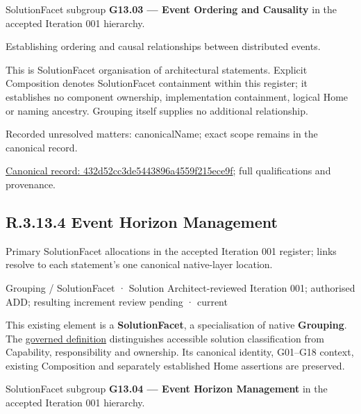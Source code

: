 SolutionFacet subgroup \textbf{G13.03 — Event Ordering and Causality} in the accepted Iteration 001 hierarchy.



Establishing ordering and causal relationships between distributed events.



This is SolutionFacet organisation of architectural statements. Explicit Composition denotes SolutionFacet containment within this register; it establishes no component ownership, implementation containment, logical Home or naming ancestry. Grouping itself supplies no additional relationship.


{\small Recorded unresolved matters: canonicalName; exact scope remains in the canonical record.}\par
{\footnotesize \href{../../../../../../../continuum/grouping/432d52cc3de5443896a4559f215ece9f.md}{Canonical record: 432d52cc3de5443896a4559f215ece9f}; full qualifications and provenance.}\par
\subsection*{R.3.13.4 Event Horizon Management}
\label{navigation:R.3.13.4}

Primary SolutionFacet allocations in the accepted Iteration 001 register; links resolve to each statement’s one canonical native-layer location.\par
\label{element:22fce0d656ef4df89d2a35a85fa92aa1}
{\small Grouping / SolutionFacet · Solution Architect-reviewed Iteration 001; authorised ADD; resulting increment review pending · current}\par

This existing element is a \textbf{SolutionFacet}, a specialisation of native
\textbf{Grouping}. The \href{\detokenize{../../../../../../../governance/continuum-representation.md#solutionfacet-classification--1119-candidate}}{governed definition}
distinguishes accessible solution classification from Capability, responsibility
and ownership. Its canonical identity, G01–G18 context, existing Composition
and separately established Home assertions are preserved.



SolutionFacet subgroup \textbf{G13.04 — Event Horizon Management} in the accepted Iteration 001 hierarchy.



